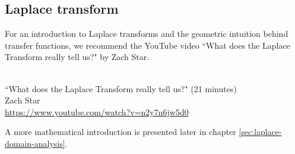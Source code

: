 \subsection{Laplace transform}

For an introduction to Laplace transforms and the geometric intuition behind
transfer functions, we recommend the YouTube video ``What does the Laplace
Transform really tell us?" by Zach Star.
\begin{bookfigure}
   \\
  ``What does the Laplace Transform really tell us?" (21 minutes) \\
  \footnotesize Zach Star \\
  \url{https://www.youtube.com/watch?v=n2y7n6jw5d0}
\end{bookfigure}

A more mathematical introduction is presented later in chapter
\ref{sec:laplace-domain-analysis}.
